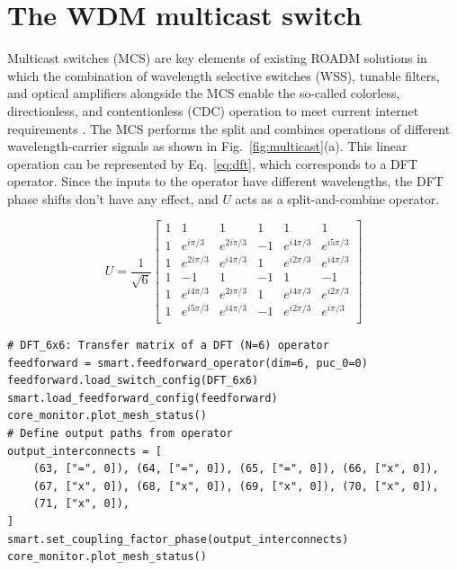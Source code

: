 \section{The WDM multicast switch}


Multicast switches (MCS) are key elements of existing ROADM solutions in which the combination of wavelength selective switches (WSS), tunable filters, and optical amplifiers alongside the MCS enable the so-called colorless, directionless, and contentionless (CDC) operation to meet current internet requirements \cite{watanabe_multicast_2014,yang_low-cost_2017}.
The MCS performs the split and combines operations of different wavelength-carrier signals as shown in Fig.~\ref{fig:multicast}(a).
This linear operation can be represented by Eq.~\eqref{eq:dft}, which corresponds to a DFT operator.
Since the inputs to the operator have different wavelengths, the DFT phase shifts don't have any effect, and $U$ acts as a split-and-combine operator.

\begin{equation}\label{eq:dft}
	U = \frac{1}{\sqrt{6}}
	\begin{bmatrix}
		1 & 1           & 1           & 1  & 1           & 1           \\
		1 & e^{i\pi/3}  & e^{2i\pi/3} & -1 & e^{i4\pi/3} & e^{i5\pi/3} \\
		1 & e^{2i\pi/3} & e^{i4\pi/3} & 1  & e^{i2\pi/3} & e^{i4\pi/3} \\
		1 & -1          & 1           & -1 & 1           & -1          \\
		1 & e^{i4\pi/3} & e^{2i\pi/3} & 1  & e^{i4\pi/3} & e^{i2\pi/3} \\
		1 & e^{i5\pi/3} & e^{i4\pi/3} & -1 & e^{i2\pi/3} & e^{i\pi/3}  \\
	\end{bmatrix}
\end{equation}

\begin{lstlisting}[caption={Implementation of a multicast switch (MCS) using a Feedforward operator},
label={lst:ch4-mcs}]
# DFT_6x6: Transfer matrix of a DFT (N=6) operator
feedforward = smart.feedforward_operator(dim=6, puc_0=0)
feedforward.load_switch_config(DFT_6x6)
smart.load_feedforward_config(feedforward)
core_monitor.plot_mesh_status()
# Define output paths from operator
output_interconnects = [
    (63, ["=", 0]), (64, ["=", 0]), (65, ["=", 0]), (66, ["x", 0]),
    (67, ["x", 0]), (68, ["x", 0]), (69, ["x", 0]), (70, ["x", 0]),
    (71, ["x", 0]),
]
smart.set_coupling_factor_phase(output_interconnects)
core_monitor.plot_mesh_status()
\end{lstlisting}


